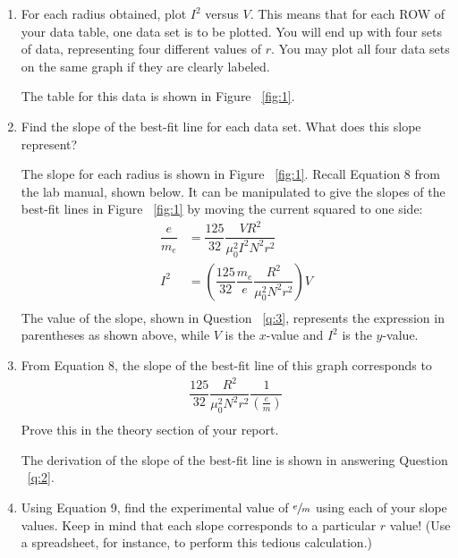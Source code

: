 \documentclass [12pt, letterpaper, twoside] {article}
\begin{document}
\begin{enumerate}
  \item{For each radius obtained, plot \(I^{2}\) versus \(V\). This means that for each ROW of your data table, one data set is to be plotted. You will end up with four sets of data, representing four different values of \(r\). You may plot all four data sets on the same graph if they are clearly labeled.}
  
    The table for this data is shown in Figure ~\ref{fig:1}.

  \item{Find the slope of the best-fit line for each data set.  What does this slope represent?}{\label{q:2}}

    The slope for each radius is shown in Figure ~\ref{fig:1}. Recall Equation 8 from the lab manual, shown below. It can be manipulated to give the slopes of the best-fit lines in Figure ~\ref{fig:1} by moving the current squared to one side:
    \begin{equation*}
      \begin{split}
        \dfrac{e}{m_{e}} &= \dfrac{125}{32}\dfrac{VR^{2}}{\mu_{0}^{2}I^{2}N^{2}r^{2}} \\
        I^{2} &= \left(\dfrac{125}{32}\dfrac{m_{e}}{e}\dfrac{R^{2}}{\mu_{0}^{2}N^{2}r^{2}}\right)V \\ 
      \end{split}
    \end{equation*}
    The value of the slope, shown in Question ~\ref{q:3}, represents the expression in parentheses as shown above, while \(V\) is the \(x\)-value and \(I^{2}\) is the \(y\)-value.

  \item{From Equation 8, the slope of the best-fit line of this graph corresponds to
  \begin{equation*}
    \begin{split}
      \dfrac{125}{32}\dfrac{R^{2}}{\mu_{0}^{2}N^{2}r^{2}}\dfrac{1}{\left(\tfrac{e}{m}\right)} \\
    \end{split}
  \end{equation*}
  Prove this in the theory section of your report.}{\label{q:3}}

    The derivation of the slope of the best-fit line is shown in answering Question ~\ref{q:2}.
    
  \item{Using Equation 9, find the experimental value of \(\sfrac{e}{m}\) using each of your slope values. Keep in mind that each slope corresponds to a particular \(r\) value! (Use a spreadsheet, for instance, to perform this tedious calculation.)}
    

\end{enumerate}
\end{document}
